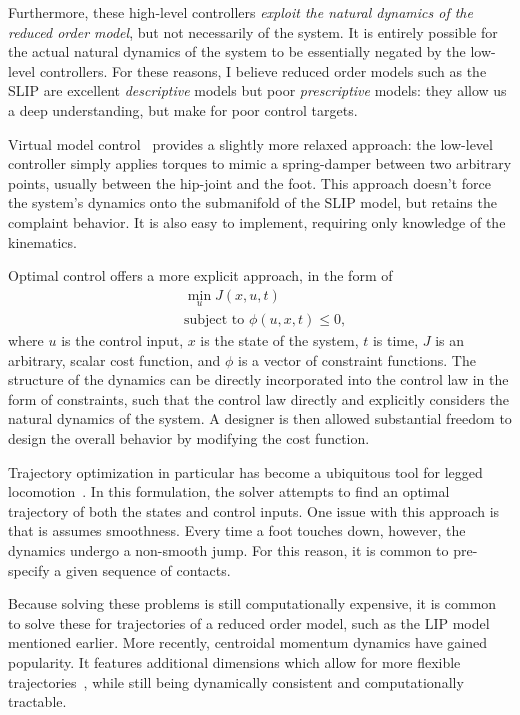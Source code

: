 Furthermore, these high-level controllers \emph{exploit the natural dynamics of the reduced order model}, but not necessarily of the system. It is entirely possible for the actual natural dynamics of the system to be essentially negated by the low-level controllers.
For these reasons, I believe reduced order models such as the SLIP are excellent \emph{descriptive} models but poor \emph{prescriptive} models: they allow us a deep understanding, but make for poor control targets. \par
Virtual model control~\cite{pratt2001virtual,renjewski2015exciting} provides a slightly more relaxed approach: the low-level controller simply applies torques to mimic a spring-damper between two arbitrary points, usually between the hip-joint and the foot. This approach doesn't force the system's dynamics onto the submanifold of the SLIP model, but retains the complaint behavior. It is also easy to implement, requiring only knowledge of the kinematics. \par
Optimal control offers a more explicit approach, in the form of
\begin{align*}
& \min_{u} J(x, u, t) \\
& \text{subject to } \phi(u, x, t) \leq 0,
\end{align*}
where $u$ is the control input, $x$ is the state of the system, $t$ is time, $J$ is an arbitrary, scalar cost function, and $\phi$ is a vector of constraint functions.
The structure of the dynamics can be directly incorporated into the control law in the form of constraints, such that the control law directly and explicitly considers the natural dynamics of the system.
A designer is then allowed substantial freedom to design the overall behavior by modifying the cost function. \par
Trajectory optimization in particular has become a ubiquitous tool for legged locomotion~\cite{kelly2017introduction}. In this formulation, the solver attempts to find an optimal trajectory of both the states and control inputs.
One issue with this approach is that is assumes smoothness. Every time a foot touches down, however, the dynamics undergo a non-smooth jump. For this reason, it is common to pre-specify a given sequence of contacts.

Because solving these problems is still computationally expensive, it is common to solve these for trajectories of a reduced order model, such as the LIP model mentioned earlier. More recently, centroidal momentum dynamics have gained popularity. It features additional dimensions which allow for more flexible trajectories~\cite{dai2014whole,koolen2016balance,ponton2016convex}, while still being dynamically consistent and computationally tractable.

